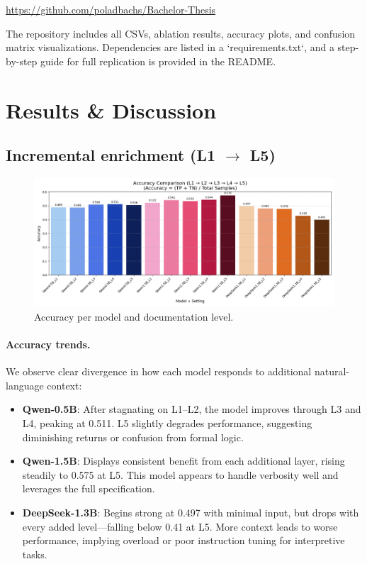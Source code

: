 \documentclass[a4paper]{usiinfbachelorproject}
\begin{document}
\begin{center}
\url{https://github.com/poladbachs/Bachelor-Thesis}
\end{center}

The repository includes all CSVs, ablation results, accuracy plots, and confusion matrix visualizations. Dependencies are listed in a `requirements.txt`, and a step-by-step guide for full replication is provided in the README.


\section{Results \& Discussion}\label{sec:results}

\subsection{Incremental enrichment (L1 $\rightarrow$ L5)}

\begin{figure}[H]\centering
  \includegraphics[width=0.95\linewidth]{figures/accuracy_comparison.png}
  \caption{Accuracy per model and documentation level.}
  \label{fig:acc-l1-l5}
\end{figure}

\paragraph*{Accuracy trends.}
We observe clear divergence in how each model responds to additional natural-language context:

\begin{itemize}[leftmargin=12pt]
  \item \textbf{Qwen-0.5B}: After stagnating on L1–L2, the model improves through L3 and L4, peaking at 0.511. L5 slightly degrades performance, suggesting diminishing returns or confusion from formal logic.
  
  \item \textbf{Qwen-1.5B}: Displays consistent benefit from each additional layer, rising steadily to 0.575 at L5. This model appears to handle verbosity well and leverages the full specification.

  \item \textbf{DeepSeek-1.3B}: Begins strong at 0.497 with minimal input, but drops with every added level—falling below 0.41 at L5. More context leads to worse performance, implying overload or poor instruction tuning for interpretive tasks.
\end{itemize}
\end{document}

